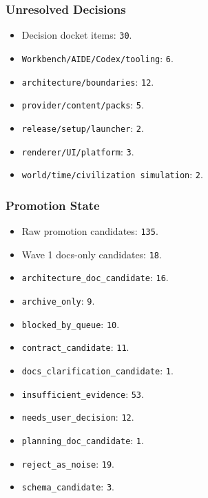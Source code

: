 \documentclass[9pt,a4paper,openany]{book}
\begin{document}
\subsubsection{Unresolved Decisions}

\begin{itemize}
\item Decision docket items: \texttt{30}.\allowbreak{}
\item \texttt{Workbench/\allowbreak{}AIDE/\allowbreak{}Codex/\allowbreak{}tooling}: \texttt{6}.\allowbreak{}
\item \texttt{architecture/\allowbreak{}boundaries}: \texttt{12}.\allowbreak{}
\item \texttt{provider/\allowbreak{}content/\allowbreak{}packs}: \texttt{5}.\allowbreak{}
\item \texttt{release/\allowbreak{}setup/\allowbreak{}launcher}: \texttt{2}.\allowbreak{}
\item \texttt{renderer/\allowbreak{}UI/\allowbreak{}platform}: \texttt{3}.\allowbreak{}
\item \texttt{world/\allowbreak{}time/\allowbreak{}civilization simulation}: \texttt{2}.\allowbreak{}
\end{itemize}

\subsubsection{Promotion State}

\begin{itemize}
\item Raw promotion candidates: \texttt{135}.\allowbreak{}
\item Wave 1 docs-\allowbreak{}only candidates: \texttt{18}.\allowbreak{}
\item \texttt{architecture\_\allowbreak{}doc\_\allowbreak{}candidate}: \texttt{16}.\allowbreak{}
\item \texttt{archive\_\allowbreak{}only}: \texttt{9}.\allowbreak{}
\item \texttt{blocked\_\allowbreak{}by\_\allowbreak{}queue}: \texttt{10}.\allowbreak{}
\item \texttt{contract\_\allowbreak{}candidate}: \texttt{11}.\allowbreak{}
\item \texttt{docs\_\allowbreak{}clarification\_\allowbreak{}candidate}: \texttt{1}.\allowbreak{}
\item \texttt{insufficient\_\allowbreak{}evidence}: \texttt{53}.\allowbreak{}
\item \texttt{needs\_\allowbreak{}user\_\allowbreak{}decision}: \texttt{12}.\allowbreak{}
\item \texttt{planning\_\allowbreak{}doc\_\allowbreak{}candidate}: \texttt{1}.\allowbreak{}
\item \texttt{reject\_\allowbreak{}as\_\allowbreak{}noise}: \texttt{19}.\allowbreak{}
\item \texttt{schema\_\allowbreak{}candidate}: \texttt{3}.\allowbreak{}
\end{itemize}
\end{document}

